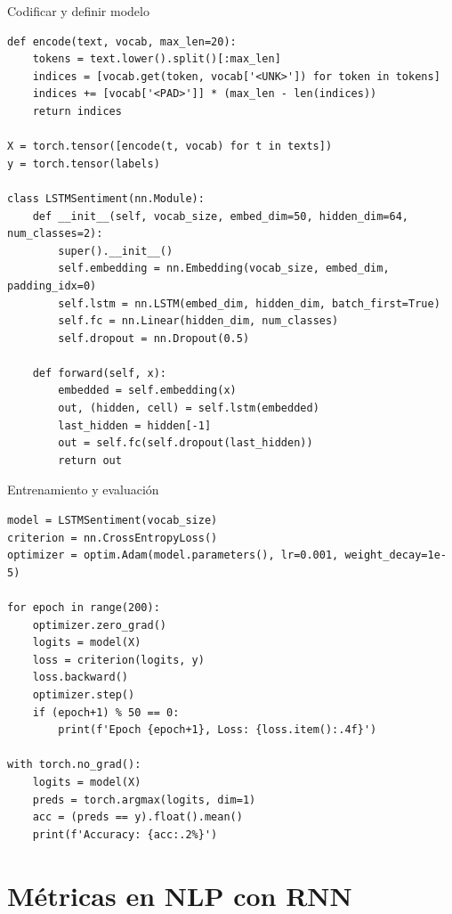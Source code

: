\documentclass[aspectratio=169, 10pt, xcolor=table]{beamer}
\begin{document}
\begin{frame}[fragile]{Codificar y definir modelo}
    \begin{lstlisting}
def encode(text, vocab, max_len=20):
    tokens = text.lower().split()[:max_len]
    indices = [vocab.get(token, vocab['<UNK>']) for token in tokens]
    indices += [vocab['<PAD>']] * (max_len - len(indices))
    return indices

X = torch.tensor([encode(t, vocab) for t in texts])
y = torch.tensor(labels)

class LSTMSentiment(nn.Module):
    def __init__(self, vocab_size, embed_dim=50, hidden_dim=64, num_classes=2):
        super().__init__()
        self.embedding = nn.Embedding(vocab_size, embed_dim, padding_idx=0)
        self.lstm = nn.LSTM(embed_dim, hidden_dim, batch_first=True)
        self.fc = nn.Linear(hidden_dim, num_classes)
        self.dropout = nn.Dropout(0.5)

    def forward(self, x):
        embedded = self.embedding(x)
        out, (hidden, cell) = self.lstm(embedded)
        last_hidden = hidden[-1]
        out = self.fc(self.dropout(last_hidden))
        return out
    \end{lstlisting}
\end{frame}

\begin{frame}[fragile]{Entrenamiento y evaluación}
    \begin{lstlisting}
model = LSTMSentiment(vocab_size)
criterion = nn.CrossEntropyLoss()
optimizer = optim.Adam(model.parameters(), lr=0.001, weight_decay=1e-5)

for epoch in range(200):
    optimizer.zero_grad()
    logits = model(X)
    loss = criterion(logits, y)
    loss.backward()
    optimizer.step()
    if (epoch+1) % 50 == 0:
        print(f'Epoch {epoch+1}, Loss: {loss.item():.4f}')

with torch.no_grad():
    logits = model(X)
    preds = torch.argmax(logits, dim=1)
    acc = (preds == y).float().mean()
    print(f'Accuracy: {acc:.2%}')
    \end{lstlisting}
\end{frame}

\section{Métricas en NLP con RNN}
\end{document}
